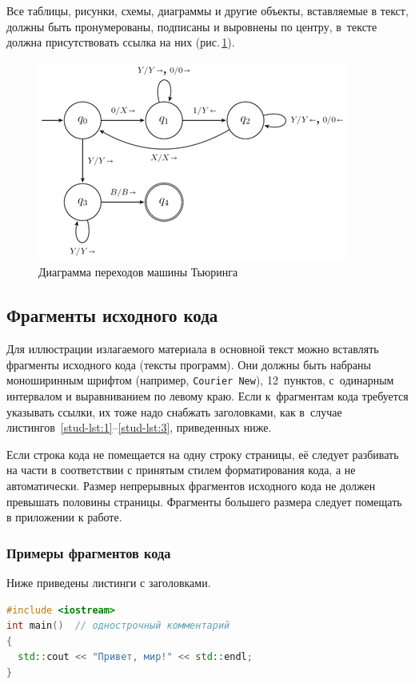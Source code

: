 \documentclass[14pt]{mmcs_article}
\begin{document}
Все таблицы, рисунки, схемы, диаграммы и другие объекты, вставляемые в текст, должны быть пронумерованы, подписаны и выровнены по центру, в~тексте должна присутствовать ссылка на них (рис.\,\ref{stud:fig:1}).


\begin{figure}[H]
  \centering
  \includegraphics[scale=1.2]{Fig_T.png}
  \caption{Диаграмма переходов машины Тьюринга}\label{stud:fig:1}
\end{figure}


\subsection{Фрагменты исходного кода}

Для иллюстрации излагаемого материала в основной текст можно вставлять фрагменты исходного кода (тексты программ). Они должны быть набраны моноширинным шрифтом (например, \texttt{Courier New}), 12~пунктов, с~одинарным интервалом и выравниванием по левому краю. Если к~фрагментам кода требуется указывать ссылки, их тоже надо снабжать заголовками, как в~случае листингов~\ref{stud-lst:1}--\ref{stud-lst:3}, приведенных ниже.

Если строка кода не помещается на одну строку страницы, её следует разбивать на части в соответствии с принятым стилем форматирования кода, а не автоматически. Размер непрерывных фрагментов исходного кода не должен превышать половины страницы. Фрагменты большего размера следует помещать в приложении к работе.


\subsubsection{Примеры фрагментов кода}

Ниже приведены листинги с заголовками.

\begin{lstlisting}[language=C++, caption={C++, пример кода}, label=stud-lst:1]
#include <iostream>
int main()  // однострочный комментарий
{
  std::cout << "Привет, мир!" << std::endl;
}
\end{lstlisting}
\end{document}
